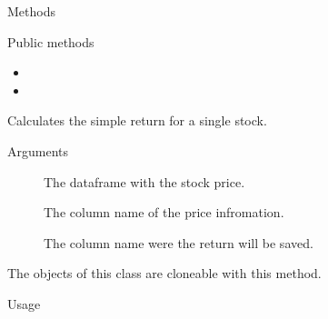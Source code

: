 \documentclass[a4paper]{book}
\begin{document}
\begin{Section}{Methods}
%
\begin{SubSection}{Public methods}
\begin{itemize}

\item{} 
\item{} 

\end{itemize}

\end{SubSection}



\hypertarget{method-SimpleReturn-calculate_return}{}
%
\begin{SubSection}{}
Calculates the simple return for a
single stock.
%

%
\begin{SubSubSection}{Arguments}

\begin{description}

\item[] The dataframe with the stock price.
\item[] The column name of the price
infromation.
\item[] The column name were the
return will be saved.

\end{description}



\end{SubSubSection}

\end{SubSection}




\hypertarget{method-SimpleReturn-clone}{}
%
\begin{SubSection}{}
The objects of this class are cloneable with this method.
%
\begin{SubSubSection}{Usage}


\end{SubSubSection}
\end{SubSection}
\end{Section}
\end{document}
